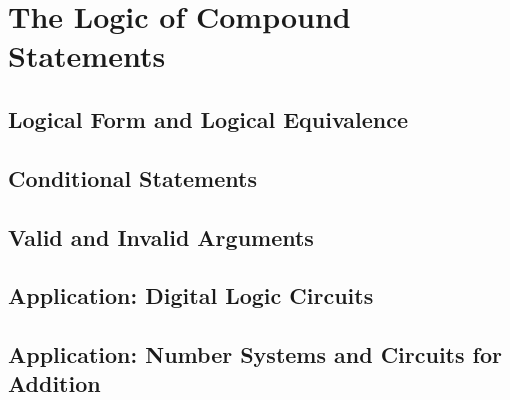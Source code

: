 \section{The Logic of Compound Statements}
\subsection{Logical Form and Logical Equivalence}
\subsection{Conditional Statements}
\subsection{Valid and Invalid Arguments}
\subsection{Application: Digital Logic Circuits}
\subsection{Application: Number Systems and Circuits for Addition}